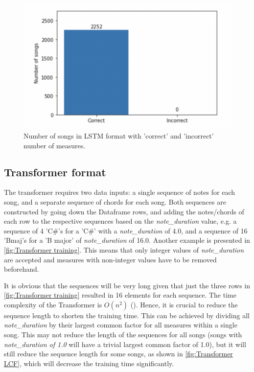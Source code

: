\begin{figure}
    \centering
    \includegraphics{Figures/LSTM check}
    \decoRule
    \caption{Number of songs in LSTM format with 'correct' and 'incorrect' number of measures.}
    \label{fig:LSTM check}
    \end{figure}

\subsection{Transformer format}
\label{Transformer format for training}
The transformer requires two data inputs: a single sequence of notes for each song, and a separate sequence of chords for each song. Both sequences are constructed by going down the Dataframe rows, and adding the notes/chords of each row to the respective sequences based on the \emph{note\_duration} value, e.g. a sequence of 4 'C\#'s for a 'C\#' with a \emph{note\_duration} of 4.0, and a sequence of 16 'Bmaj's for a 'B major' of \emph{note\_duration} of 16.0. Another example is presented in \cref{fig:Transformer training}. This means that only integer values of \emph{note\_duration} are accepted and measures with non-integer values have to be removed beforehand.

It is obvious that the sequences will be very long given that just the three rows in \cref{fig:Transformer training} resulted in 16 elements for each sequence. The time complexity of the Transformer is $O({n}^2)$ (\cite{StanfordTransformer}). Hence, it is crucial to reduce the sequence length to shorten the training time. This can be achieved by dividing all \emph{note\_duration} by their largest common factor for all measures within a single song. This may not reduce the length of the sequences for all songs (songs with \emph{note\_duration of 1.0} will have a trivial largest common factor of 1.0), but it will still reduce the sequence length for some songs, as shown in \cref{fig:Transformer LCF}, which will decrease the training time significantly.


